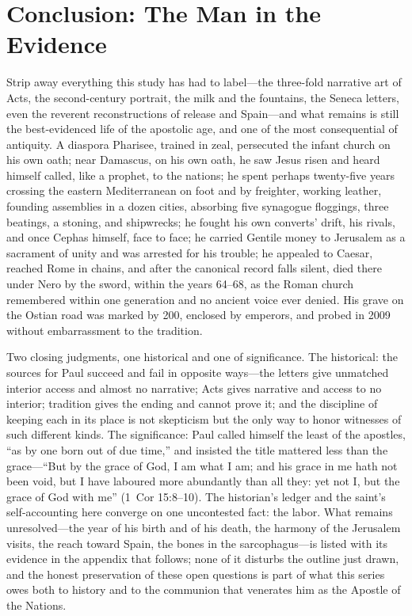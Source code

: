 \section{Conclusion: The Man in the Evidence}

Strip away everything this study has had to label---the three-fold
narrative art of Acts, the second-century portrait, the milk and the
fountains, the Seneca letters, even the reverent reconstructions of
release and Spain---and what remains is still the best-evidenced life of
the apostolic age, and one of the most consequential of antiquity. A
diaspora Pharisee, trained in zeal, persecuted the infant church on his
own oath; near Damascus, on his own oath, he saw Jesus risen and heard
himself called, like a prophet, to the nations; he spent perhaps
twenty-five years crossing the eastern Mediterranean on foot and by
freighter, working leather, founding assemblies in a dozen cities,
absorbing five synagogue floggings, three beatings, a stoning, and
shipwrecks; he fought his own converts' drift, his rivals, and once
Cephas himself, face to face; he carried Gentile money to Jerusalem as a
sacrament of unity and was arrested for his trouble; he appealed to
Caesar, reached Rome in chains, and after the canonical record falls
silent, died there under Nero by the sword, within the years 64--68, as
the Roman church remembered within one generation and no ancient voice
ever denied. His grave on the Ostian road was marked by 200, enclosed by
emperors, and probed in 2009 without embarrassment to the tradition.

Two closing judgments, one historical and one of significance. The
historical: the sources for Paul succeed and fail in opposite ways---the
letters give unmatched interior access and almost no narrative; Acts
gives narrative and access to no interior; tradition gives the ending and
cannot prove it; and the discipline of keeping each in its place is not
skepticism but the only way to honor witnesses of such different kinds.
The significance: Paul called himself the least of the apostles, ``as by
one born out of due time,'' and insisted the title mattered less than the
grace---``But by the grace of God, I am what I am; and his grace in me
hath not been void, but I have laboured more abundantly than all they:
yet not I, but the grace of God with me'' (1~Cor 15:8--10). The
historian's ledger and the saint's self-accounting here converge on one
uncontested fact: the labor. What remains unresolved---the year of his
birth and of his death, the harmony of the Jerusalem visits, the reach
toward Spain, the bones in the sarcophagus---is listed with its evidence
in the appendix that follows; none of it disturbs the outline just
drawn, and the honest preservation of these open questions is part of
what this series owes both to history and to the communion that
venerates him as the Apostle of the Nations.
